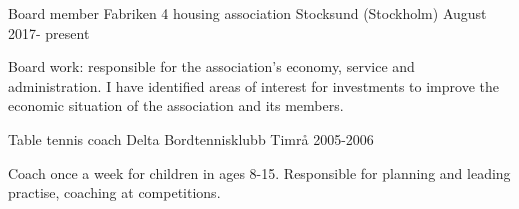


\begin{cventries}


\cventry
{Board member} %
{Fabriken 4 housing association} %
{Stocksund (Stockholm)} %
{August 2017- present} %
{ %
\begin{cvitems}
\item {Board work: responsible for the association's economy, service and administration. 
			I have identified areas of interest for investments to improve the economic situation of the association and its members. }
\end{cvitems}
}

\cventry
{Table tennis coach} %
{Delta Bordtennisklubb} %
{Timr{\aa}} %
{2005-2006} %
{ %
\begin{cvitems}
\item {Coach once a week for children in ages 8-15. 
		Responsible for planning and leading practise, coaching at competitions. 
		}
\end{cvitems}
}


\end{cventries}